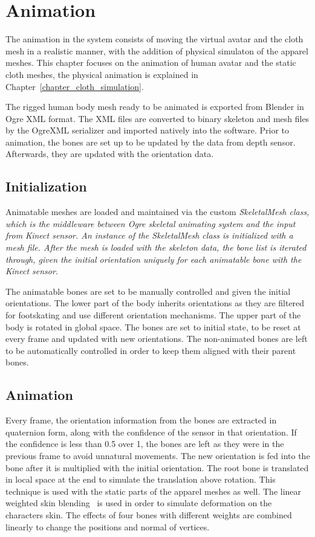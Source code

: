 \chapter{Animation}
\label{chapter_animation}

The animation in the system consists of moving the virtual avatar and the cloth mesh in a realistic manner, with the addition of physical simulaton of the apparel meshes. This chapter focuses on the animation of human avatar and the static cloth meshes, the physical animation is explained in Chapter~\ref{chapter_cloth_simulation}.

The rigged human body mesh ready to be animated is exported from Blender in Ogre XML format. The XML files are converted to binary skeleton and mesh files by the OgreXML serializer and imported natively into the software. Prior to animation, the bones are set up to be updated by the data from depth sensor. Afterwards, they are updated with the orientation data.

\section{Initialization}
\label{section_animation_initialization}

Animatable meshes are loaded and maintained via the custom \em{SkeletalMesh} class, which is the middleware between Ogre skeletal animating system and the input from Kinect sensor. An instance of the \em{SkeletalMesh} class is initialized with a mesh file. After the mesh is loaded with the skeleton data, the bone list is iterated through, given the initial orientation uniquely for each animatable bone with the Kinect sensor. 

The animatable bones are set to be manually controlled and given the initial orientations. The lower part of the body inherits orientations as they are filtered for footskating and use different orientation mechanisms. The upper part of the body is rotated in global space. The bones are set to initial state, to be reset at every frame and updated with new orientations. The non-animated bones are left to be automatically controlled in order to keep them aligned with their parent bones. 

\section{Animation}
\label{section_animation}
Every frame, the orientation information from the bones are extracted in quaternion form, along with the confidence of the sensor in that orientation. If the confidence is less than 0.5 over 1, the bones are left as they were in the previous frame to avoid unnatural movements. The new orientation is fed into the bone after it is multiplied with the initial orientation. The root bone is translated in local space at the end to simulate the translation above rotation. This technique is used with the static parts of the apparel meshes as well. The linear weighted skin blending~\cite{Kavan2003} is used in order to simulate deformation on the characters skin. The effects of four bones with different weights are combined linearly to change the positions and normal of vertices. 

